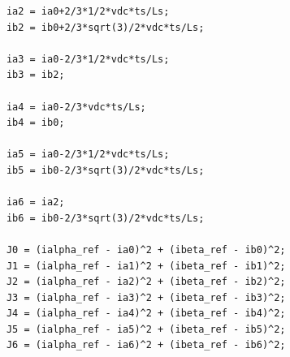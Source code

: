 \documentclass[12pt,a4paper,oneside]{book}
\begin{document}
\begin{onehalfspace}
\begin{mybox}
{\begin{verbatim}
			ia2 = ia0+2/3*1/2*vdc*ts/Ls;
			ib2 = ib0+2/3*sqrt(3)/2*vdc*ts/Ls;
			
			ia3 = ia0-2/3*1/2*vdc*ts/Ls;
			ib3 = ib2;
			
			ia4 = ia0-2/3*vdc*ts/Ls;
			ib4 = ib0;    
			
			ia5 = ia0-2/3*1/2*vdc*ts/Ls;
			ib5 = ib0-2/3*sqrt(3)/2*vdc*ts/Ls;
			
			ia6 = ia2;
			ib6 = ib0-2/3*sqrt(3)/2*vdc*ts/Ls;
			
			J0 = (ialpha_ref - ia0)^2 + (ibeta_ref - ib0)^2;
			J1 = (ialpha_ref - ia1)^2 + (ibeta_ref - ib1)^2;
			J2 = (ialpha_ref - ia2)^2 + (ibeta_ref - ib2)^2;
			J3 = (ialpha_ref - ia3)^2 + (ibeta_ref - ib3)^2;
			J4 = (ialpha_ref - ia4)^2 + (ibeta_ref - ib4)^2;
			J5 = (ialpha_ref - ia5)^2 + (ibeta_ref - ib5)^2;
			J6 = (ialpha_ref - ia6)^2 + (ibeta_ref - ib6)^2;
			

\end{verbatim}}
\end{mybox}
\end{onehalfspace}
\end{document}
